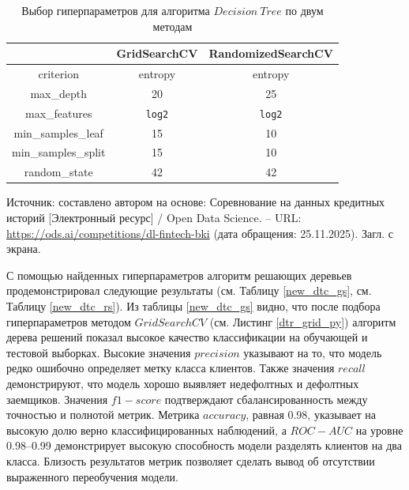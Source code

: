 \begin{table}[H]
	\centering
	\caption{Выбор гиперпараметров для алгоритма $Decision\ Tree$ по двум методам}
	\label{tab:dt_params}
	\begin{tabular}{|c|c|c|}
		\hline
		& GridSearchCV & RandomizedSearchCV \\ \hline
		criterion           & entropy      &  entropy \\ \hline
		max\_depth          & 20           & 25 \\ \hline
		max\_features       & \texttt{log2}&  \texttt{log2} \\ \hline
		min\_samples\_leaf  & 15           & 10 \\ \hline
		min\_samples\_split & 15           &  10 \\ \hline
		random\_state       & 42           &  42 \\ \hline
	\end{tabular}
	 \begin{minipage}{\textwidth}
		\fontsize{9}{11}\selectfont
		\justifying
		Источник: составлено автором на основе: Соревнование на данных кредитных историй [Электронный ресурс] / Open Data Science. -- URL: \url{https://ods.ai/competitions/dl-fintech-bki} (дата обращения: 25.11.2025). Загл. с экрана.
	\end{minipage}
\end{table}

С помощью найденных гиперпараметров алгоритм решающих деревьев продемонстрировал следующие результаты (см. Таблицу \ref{new_dtc_gs}, см. Таблицу \ref{new_dtc_rs}). Из таблицы \ref{new_dtc_gs} видно, что после подбора гиперпараметров методом $GridSearchCV$ (см. Листинг \ref{dtr_grid_py}) алгоритм дерева решений показал высокое качество классификации на обучающей и тестовой выборках. Высокие значения $precision$ указывают на то, что модель редко ошибочно определяет метку класса клиентов. Также значения $recall$ демонстрируют, что модель хорошо выявляет недефолтных и дефолтных заемщиков. Значения $f1-score$ подтверждают сбалансированность между точностью и полнотой метрик. Метрика $accuracy$, равная 0.98, указывает на высокую долю верно классифицированных наблюдений, а $ROC-AUC$ на уровне 0.98--0.99 демонстрирует высокую способность модели разделять клиентов на два класса. Близость результатов метрик позволяет сделать вывод об отсутствии выраженного переобучения модели.

